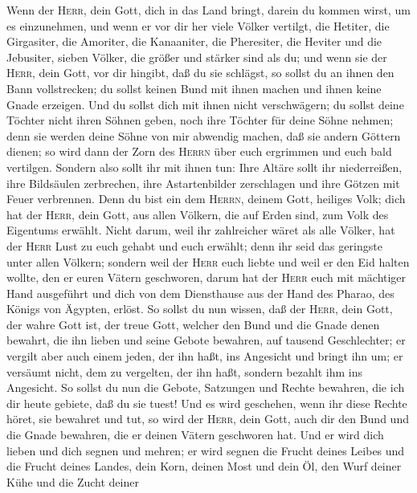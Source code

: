  Wenn der \textsc{Herr}, dein Gott, dich in das Land
bringt, darein du kommen wirst, um es einzunehmen, und wenn er vor dir
her viele Völker vertilgt, die Hetiter, die Girgasiter, die Amoriter,
die Kanaaniter, die Pheresiter, die Heviter und die Jebusiter, sieben
Völker, die größer und stärker sind als du;  und wenn sie
der \textsc{Herr}, dein Gott, vor dir hingibt, daß du sie schlägst, so
sollst du an ihnen den Bann vollstrecken; du sollst keinen Bund mit
ihnen machen und ihnen keine Gnade erzeigen.  Und du
sollst dich mit ihnen nicht verschwägern; du sollst deine Töchter nicht
ihren Söhnen geben, noch ihre Töchter für deine Söhne nehmen;
 denn sie werden deine Söhne von mir abwendig machen, daß
sie andern Göttern dienen; so wird dann der Zorn des \textsc{Herrn} über
euch ergrimmen und euch bald vertilgen.  Sondern also
sollt ihr mit ihnen tun: Ihre Altäre sollt ihr niederreißen, ihre
Bildsäulen zerbrechen, ihre Astartenbilder zerschlagen und ihre Götzen
mit Feuer verbrennen.  Denn du bist ein dem
\textsc{Herrn}, deinem Gott, heiliges Volk; dich hat der \textsc{Herr},
dein Gott, aus allen Völkern, die auf Erden sind, zum Volk des Eigentums
erwählt.  Nicht darum, weil ihr zahlreicher wäret als alle
Völker, hat der \textsc{Herr} Lust zu euch gehabt und euch erwählt; denn
ihr seid das geringste unter allen Völkern;  sondern weil
der \textsc{Herr} euch liebte und weil er den Eid halten wollte, den er
euren Vätern geschworen, darum hat der \textsc{Herr} euch mit mächtiger
Hand ausgeführt und dich von dem Diensthause aus der Hand des Pharao,
des Königs von Ägypten, erlöst.  So sollst du nun wissen,
daß der \textsc{Herr}, dein Gott, der wahre Gott ist, der treue Gott,
welcher den Bund und die Gnade denen bewahrt, die ihn lieben und seine
Gebote bewahren, auf tausend Geschlechter;  er vergilt
aber auch einem jeden, der ihn haßt, ins Angesicht und bringt ihn um; er
versäumt nicht, dem zu vergelten, der ihn haßt, sondern bezahlt ihm ins
Angesicht.  So sollst du nun die Gebote, Satzungen und
Rechte bewahren, die ich dir heute gebiete, daß du sie tuest!
 Und es wird geschehen, wenn ihr diese Rechte höret, sie
bewahret und tut, so wird der \textsc{Herr}, dein Gott, auch dir den
Bund und die Gnade bewahren, die er deinen Vätern geschworen hat.
 Und er wird dich lieben und dich segnen und mehren; er
wird segnen die Frucht deines Leibes und die Frucht deines Landes, dein
Korn, deinen Most und dein Öl, den Wurf deiner Kühe und die Zucht deiner
